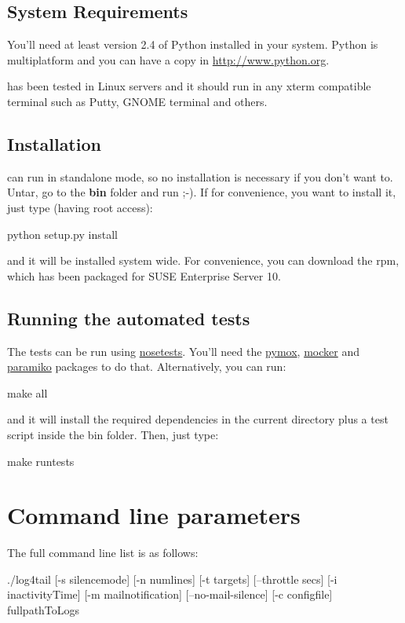 \subsection{System Requirements}

You'll need at least version 2.4 of Python installed in your system.  Python is
multiplatform and you can have a copy in
\href{http://www.python.org}{http://www.python.org}.  

\logftailer{} has been tested in Linux servers and it should run in any xterm
compatible terminal such as Putty, GNOME terminal and others.

\subsection{Installation}
\logftailer{} can run in standalone mode, so no installation is necessary if
you don't want to.  Untar, go to the \textbf{bin} folder and run ;-).  If for
convenience, you want to install it, just type (having root access):
\begin{cmd}
 python setup.py install
\end{cmd}
and it will be installed system wide. For convenience, you can download the
rpm, which has been packaged for SUSE Enterprise Server 10.

\subsection{Running the automated tests}
The tests can be run using \href{http://somethingaboutorange.com/mrl/projects/nose/0.11.3/}
{nosetests}. You'll need the \href{http://code.google.com/p/pymox/}{pymox}, 
\href{http://labix.org/mocker}{mocker} and 
\href{http://www.lag.net/paramiko/packages}{paramiko} packages to do that.
Alternatively, you can run:
\begin{cmd}
 make all
\end{cmd}
and it will install the required dependencies in the current directory plus a test script 
inside the bin folder. Then, just type:
\begin{cmd}
 make runtests
\end{cmd}

\section{Command line parameters}
The full command line list is as follows:
\begin{cmd}
 ./log4tail [-s silencemode] [-n numlines] [-t targets] [--throttle secs] [-i inactivityTime] 
                 [-m mailnotification] [--no-mail-silence] [-c configfile] fullpathToLogs
\end{cmd}


\newpage
